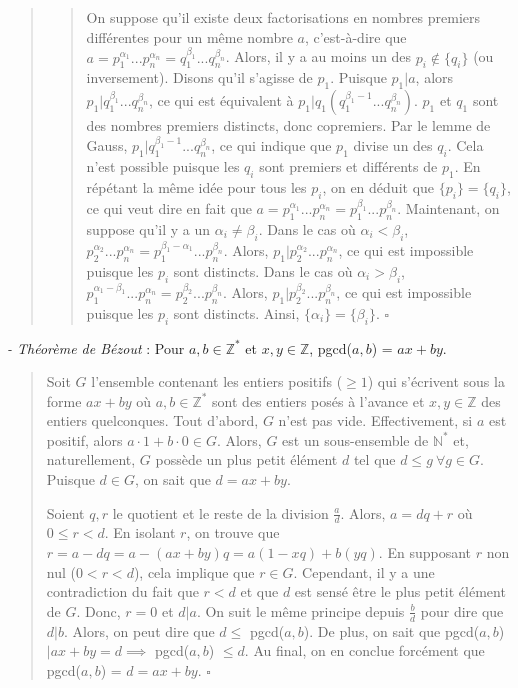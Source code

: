 \begin{quote}
    \begin{quote}
        On suppose qu'il existe deux factorisations en nombres premiers différentes pour un même nombre $a$, c'est-à-dire que $a = p_1^{\alpha_1}...p_n^{\alpha_n} = q_1^{\beta_1}...q_n^{\beta_n}$. Alors, il y a au moins un des $p_i \not\in \{q_i\}$ (ou inversement). Disons qu'il s'agisse de $p_1$. Puisque $p_1|a$, alors $p_1| q_1^{\beta_1}...q_n^{\beta_n}$, ce qui est équivalent à $p_1|q_1(q_1^{\beta_1 - 1}...q_n^{\beta_n})$. $p_1$ et $q_1$ sont des nombres premiers distincts, donc copremiers. Par le lemme de Gauss, $p_1|q_1^{\beta_1 - 1}...q_n^{\beta_n}$, ce qui indique que $p_1$ divise un des $q_i$. Cela n'est possible puisque les $q_i$ sont premiers et différents de $p_1$. En répétant la même idée pour tous les $p_i$, on en déduit que $\{p_i\} = \{q_i\}$, ce qui veut dire en fait que $a = p_1^{\alpha_1}...p_n^{\alpha_n} = p_1^{\beta_1}...p_n^{\beta_n}$. Maintenant, on suppose qu'il y a un $\alpha_i \not= \beta_i$. Dans le cas où $\alpha_i < \beta_i$, $p_2^{\alpha_2}...p_n^{\alpha_n} = p_1^{\beta_1 - \alpha_1}...p_n^{\beta_n}$. Alors, $p_1|p_2^{\alpha_2}...p_n^{\alpha_n}$, ce qui est impossible puisque les $p_i$ sont distincts. Dans le cas où $\alpha_i > \beta_i$, $p_1^{\alpha_1 - \beta_1}...p_n^{\alpha_n} = p_2^{\beta_2}...p_n^{\beta_n}$. Alors, $p_1|p_2^{\beta_2}...p_n^{\beta_n}$, ce qui est impossible puisque les $p_i$ sont distincts. Ainsi, $\{\alpha_i\} = \{\beta_i\}$. $\square$
    \end{quote}

\end{quote}

\textit{- Théorème de Bézout} : Pour $a,b \in \mathbb{Z}^{*}$ et $x,y \in \mathbb{Z}$, pgcd($a,b$) = $ax+by$.

\begin{quote}
    Soit $G$ l'ensemble contenant les entiers positifs ($\geq 1$) qui s'écrivent sous la forme $ax + by$ où $a,b \in \mathbb{Z}^{*}$ sont des entiers posés à l'avance et $x,y \in \mathbb{Z}$ des entiers quelconques. Tout d'abord, $G$ n'est pas vide. Effectivement, si $a$ est positif, alors $a \cdot 1 + b \cdot 0 \in G$. Alors, $G$ est un sous-ensemble de $\mathbb{N}^{*}$ et, naturellement, $G$ possède un plus petit élément $d$ tel que $d \leq g \ \forall g \in G$. Puisque $d \in G$, on sait que $d = ax + by$.

    Soient $q,r$ le quotient et le reste de la division $\frac{a}{d}$. Alors, $a = dq + r$ où $0 \leq r < d$. En isolant $r$, on trouve que $r = a - dq = a - (ax + by)q = a(1-xq) + b(yq)$. En supposant $r$ non nul ($0 < r < d$), cela implique que $r \in G$. Cependant, il y a une contradiction du fait que $r < d$ et que $d$ est sensé être le plus petit élément de $G$. Donc, $r = 0$ et $d|a$. On suit le même principe depuis $\frac{b}{d}$ pour dire que $d|b$. Alors, on peut dire que $d \leq$ pgcd($a,b$). De plus, on sait que pgcd($a,b$)$|ax + by = d \implies$ pgcd($a,b$) $\leq d$. Au final, on en conclue forcément que pgcd($a,b$) = $d = ax + by$. $\square$
\end{quote}

